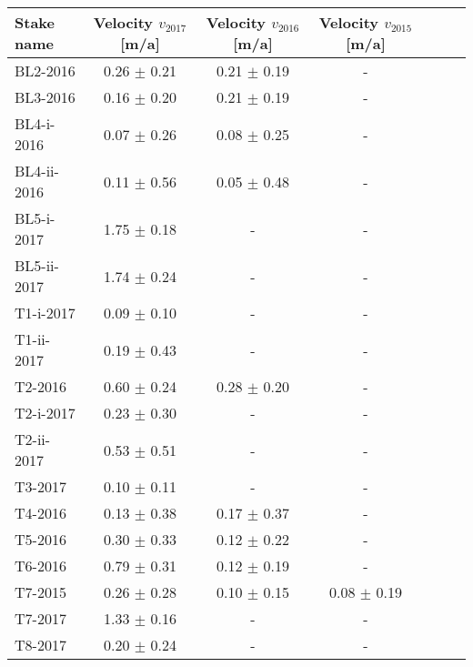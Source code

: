 \begin{tabular}{lcccccc}
\toprule
  Stake name & Velocity $v_{2017}$ [m/a] & Velocity $v_{2016}$ [m/a] & Velocity $v_{2015}$ [m/a] \\
\midrule
    BL2-2016 &           0.26 $\pm$ 0.21 &           0.21 $\pm$ 0.19 &                         - \\
    BL3-2016 &           0.16 $\pm$ 0.20 &           0.21 $\pm$ 0.19 &                         - \\
  BL4-i-2016 &           0.07 $\pm$ 0.26 &           0.08 $\pm$ 0.25 &                         - \\
 BL4-ii-2016 &           0.11 $\pm$ 0.56 &           0.05 $\pm$ 0.48 &                         - \\
  BL5-i-2017 &           1.75 $\pm$ 0.18 &                         - &                         - \\
 BL5-ii-2017 &           1.74 $\pm$ 0.24 &                         - &                         - \\
   T1-i-2017 &           0.09 $\pm$ 0.10 &                         - &                         - \\
  T1-ii-2017 &           0.19 $\pm$ 0.43 &                         - &                         - \\
     T2-2016 &           0.60 $\pm$ 0.24 &           0.28 $\pm$ 0.20 &                         - \\
   T2-i-2017 &           0.23 $\pm$ 0.30 &                         - &                         - \\
  T2-ii-2017 &           0.53 $\pm$ 0.51 &                         - &                         - \\
     T3-2017 &           0.10 $\pm$ 0.11 &                         - &                         - \\
     T4-2016 &           0.13 $\pm$ 0.38 &           0.17 $\pm$ 0.37 &                         - \\
     T5-2016 &           0.30 $\pm$ 0.33 &           0.12 $\pm$ 0.22 &                         - \\
     T6-2016 &           0.79 $\pm$ 0.31 &           0.12 $\pm$ 0.19 &                         - \\
     T7-2015 &           0.26 $\pm$ 0.28 &           0.10 $\pm$ 0.15 &           0.08 $\pm$ 0.19 \\
     T7-2017 &           1.33 $\pm$ 0.16 &                         - &                         - \\
     T8-2017 &           0.20 $\pm$ 0.24 &                         - &                         - \\
\bottomrule
\end{tabular}
